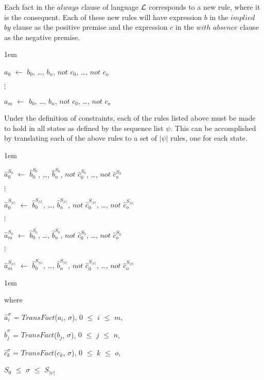 \documentclass[global,twocolumn,final]{svjour}
\newenvironment{vquote}
  {\begin{list}{}{\leftmargin 1em}\item[]}
  {\end{list}}
\begin{document}
          Each fact in the $always$ clause of language ${\cal L}$ corresponds
          to a new rule, where it is the consequent. Each of these new rules
          will have expression $b$ in the $implied$ $by$ clause as the positive
          premise and the expression $c$ in the $with$ $absence$ clause as the
          negative premise.

          \begin{vquote}
            $a_{0}$ $\leftarrow$
            $b_{0}$, \ldots, $b_{n}$,
            $not$ $c_{0}$, \ldots, $not$ $c_{o}$

            $\vdots$

            $a_{m}$ $\leftarrow$
            $b_{0}$, \ldots, $b_{n}$,
            $not$ $c_{0}$, \ldots, $not$ $c_{o}$
          \end{vquote}

          Under the definition of constraints, each of the rules listed above
          must be made to hold in all states as defined by the sequence list
          $\psi$. This can be accomplished by translating each of the above
          rules to a set of $|\psi|$ rules, one for each state.

           \begin{vquote}
            $\hat{a}^{S_{0}}_{0}$ $\leftarrow$
            $\hat{b}^{S_{0}}_{0}$, \ldots, $\hat{b}^{S_{0}}_{n}$,
            $not$ $\hat{c}^{S_{0}}_{0}$, \ldots, $not$ $\hat{c}^{S_{0}}_{o}$

            $\vdots$

            $\hat{a}^{S_{|\psi|}}_{0}$ $\leftarrow$
            $\hat{b}^{S_{|\psi|}}_{0}$, \ldots, $\hat{b}^{S_{|\psi|}}_{n}$,
            $not$ $\hat{c}^{S_{|\psi|}}_{0}$, \ldots, $not$ $\hat{c}^{S_{|\psi|}}_{o}$

            $\vdots$

            $\hat{a}^{S_{0}}_{m}$ $\leftarrow$
            $\hat{b}^{S_{0}}_{0}$, \ldots, $\hat{b}^{S_{0}}_{n}$,
            $not$ $\hat{c}^{S_{0}}_{0}$, \ldots, $not$ $\hat{c}^{S_{0}}_{o}$

            $\vdots$

            $\hat{a}^{S_{|\psi|}}_{m}$ $\leftarrow$
            $\hat{b}^{S_{|\psi|}}_{0}$, \ldots, $\hat{b}^{S_{|\psi|}}_{n}$,
            $not$ $\hat{c}^{S_{|\psi|}}_{0}$, \ldots, $not$ $\hat{c}^{S_{|\psi|}}_{o}$
          \end{vquote}

          \begin{vquote}
            where

            $\hat{a}^{\sigma}_{i}$ = $TransFact$($a_{i}$, $\sigma$),
            $0$ $\leq$ $i$ $\leq$ $m$,

            $\hat{b}^{\sigma}_{j}$ = $TransFact$($b_{j}$, $\sigma$),
            $0$ $\leq$ $j$ $\leq$ $n$,

            $\hat{c}^{\sigma}_{k}$ = $TransFact$($c_{k}$, $\sigma$),
            $0$ $\leq$ $k$ $\leq$ $o$,

            $S_{0}$ $\leq$ $\sigma$ $\leq$ $S_{|\psi|}$
          \end{vquote}
\end{document}
